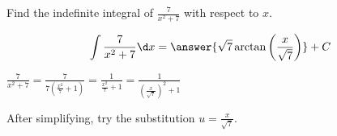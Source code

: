 \documentclass{ximera}
\author{Gregory Hartman \and Matthew Carr\and Nela Lakos \and Bobby Ramsey}
\begin{document}
\begin{exercise}

Find the indefinite integral of $\frac{7}{x^2+7}$ with respect to $x$.

\[
\int \frac{7}{x^2+7}\d x=\answer{\sqrt{7}\arctan\left(\frac{x}{\sqrt{7}}\right)}+C
\]

\begin{hint}
	$\frac{7}{x^2+7}=\frac{7}{7(\frac{x^2}{7}+1)}=\frac{1}{\frac{x^2}{7}+1}=\frac{1}{\left(\frac{x}{\sqrt{7}}\right)^2+1}$
\end{hint}
\begin{hint}
	After simplifying, try the substitution $u=\frac{x}{\sqrt{7}}$.
\end{hint}
\end{exercise}
\end{document}
